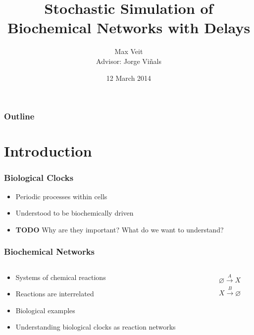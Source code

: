 \documentclass[xcolor={usenames,dvipsnames,svgnames}]{beamer}
\begin{document}
\title[Biochemical Networks]{Stochastic Simulation of Biochemical Networks with Delays}
\author[Max Veit]{Max Veit\\Advisor: Jorge Viñals}
\date[2014-03-12]{12 March 2014}
\subject{Physics}

\frame{\titlepage}

\begin{frame} \frametitle{Outline}
	\tableofcontents
\end{frame}

\section{Introduction} %
\label{sec:introduction}
\begin{frame}
	\frametitle{Biological Clocks}
	\begin{itemize}
            \item Periodic processes within cells
            \item Understood to be biochemically driven
            \item \textbf{TODO} Why are they important? What do we want to understand?
	\end{itemize}
\end{frame}

\begin{frame}
    \frametitle{Biochemical Networks}
    \begin{columns}[c]
        \begin{column}{0.5\textwidth}
            \begin{itemize}
                \item Systems of chemical reactions
                \item Reactions are interrelated
                \item Biological examples
                \item Understanding biological clocks as reaction networks
            \end{itemize}
        \end{column}
        \begin{column}{0.5\textwidth}
            \begin{align*}
                \varnothing \xrightarrow{A} X \\
                X \xrightarrow {B} \varnothing
            \end{align*}
        \end{column}
    \end{columns}
\end{frame}
\end{document}
